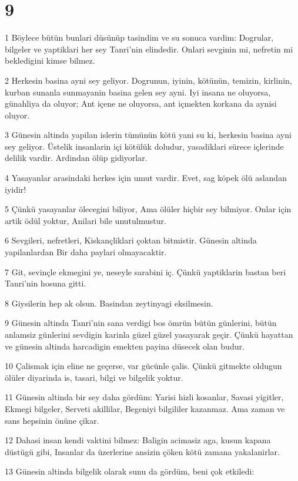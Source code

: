 \chapter{9}

\par 1 Böylece bütün bunlari düsünüp tasindim ve su sonuca vardim: Dogrular, bilgeler ve yaptiklari her sey Tanri'nin elindedir. Onlari sevginin mi, nefretin mi bekledigini kimse bilmez.
\par 2 Herkesin basina ayni sey geliyor. Dogrunun, iyinin, kötünün, temizin, kirlinin, kurban sunanla sunmayanin basina gelen sey ayni. Iyi insana ne oluyorsa, günahliya da oluyor; Ant içene ne oluyorsa, ant içmekten korkana da aynisi oluyor.
\par 3 Günesin altinda yapilan islerin tümünün kötü yani su ki, herkesin basina ayni sey geliyor. Üstelik insanlarin içi kötülük doludur, yasadiklari sürece içlerinde delilik vardir. Ardindan ölüp gidiyorlar.
\par 4 Yasayanlar arasindaki herkes için umut vardir. Evet, sag köpek ölü aslandan iyidir!
\par 5 Çünkü yasayanlar ölecegini biliyor, Ama ölüler hiçbir sey bilmiyor. Onlar için artik ödül yoktur, Anilari bile unutulmustur.
\par 6 Sevgileri, nefretleri, Kiskançliklari çoktan bitmistir. Günesin altinda yapilanlardan Bir daha paylari olmayacaktir.
\par 7 Git, sevinçle ekmegini ye, neseyle sarabini iç. Çünkü yaptiklarin bastan beri Tanri'nin hosuna gitti.
\par 8 Giysilerin hep ak olsun. Basindan zeytinyagi eksilmesin.
\par 9 Günesin altinda Tanri'nin sana verdigi bos ömrün bütün günlerini, bütün anlamsiz günlerini sevdigin karinla güzel güzel yasayarak geçir. Çünkü hayattan ve günesin altinda harcadigin emekten payina düsecek olan budur.
\par 10 Çalismak için eline ne geçerse, var gücünle çalis. Çünkü gitmekte oldugun ölüler diyarinda is, tasari, bilgi ve bilgelik yoktur.
\par 11 Günesin altinda bir sey daha gördüm: Yarisi hizli kosanlar, Savasi yigitler, Ekmegi bilgeler, Serveti akillilar, Begeniyi bilgililer kazanmaz. Ama zaman ve sans hepsinin önüne çikar.
\par 12 Dahasi insan kendi vaktini bilmez: Baligin acimasiz aga, kusun kapana düstügü gibi, Insanlar da üzerlerine ansizin çöken kötü zamana yakalanirlar.
\par 13 Günesin altinda bilgelik olarak sunu da gördüm, beni çok etkiledi:
